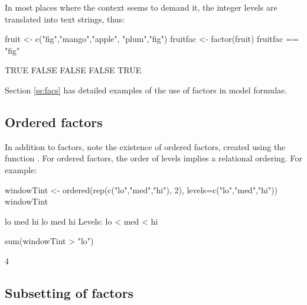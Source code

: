 In most places where the context seems to demand it, the integer levels
are translated into text strings, thus:
\begin{Schunk}
\begin{Sinput}
fruit <- c("fig","mango","apple", "plum","fig")
fruitfac <- factor(fruit)
fruitfac == "fig"
\end{Sinput}
\begin{Soutput}
[1]  TRUE FALSE FALSE FALSE  TRUE
\end{Soutput}
\end{Schunk}

Section \ref{ss:facs} has detailed examples of the use of factors
in model formulae.

\subsection*{Ordered factors}
In addition to factors, note the existence of ordered factors, created
using the function .  For ordered factors, the order
of levels implies a relational ordering.  For example:
\begin{Schunk}
\begin{Sinput}
windowTint <- ordered(rep(c("lo","med","hi"), 2),
                      levels=c("lo","med","hi"))
windowTint
\end{Sinput}
\begin{Soutput}
[1] lo  med hi  lo  med hi 
Levels: lo < med < hi
\end{Soutput}
\begin{Sinput}
sum(windowTint > "lo")
\end{Sinput}
\begin{Soutput}
[1] 4
\end{Soutput}
\end{Schunk}

\subsection*{Subsetting of factors}

